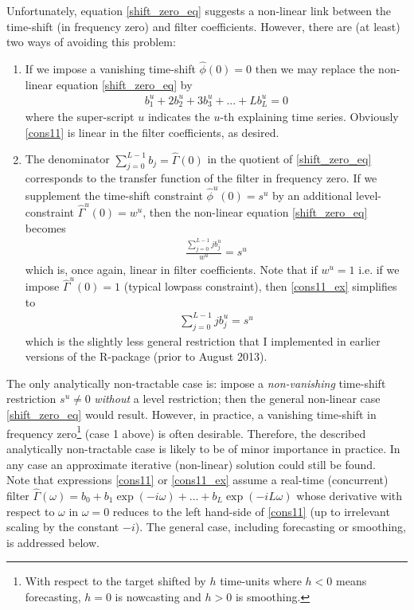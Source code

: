 \documentclass[11pt]{article}
\begin{document}
Unfortunately, equation \ref{shift_zero_eq} suggests a non-linear link between the time-shift (in frequency zero) and filter coefficients. However, there are (at least) two ways of avoiding this problem:
\begin{enumerate}
\item If we impose a vanishing time-shift $\hat{\phi}(0)=0$ then we may replace  the non-linear equation \ref{shift_zero_eq} by 
\begin{eqnarray}\label{cons11}
b_1^u+2b_2^u+3b_3^u+...+Lb_L^u=0
\end{eqnarray}
where the super-script $u$ indicates the $u$-th explaining time series. Obviously \ref{cons11} is linear in the filter coefficients, as desired.
\item The denominator $\sum_{j=0}^{L-1}b_j=\hat{\Gamma}(0)$ in the quotient of \ref{shift_zero_eq} corresponds to the transfer function of the filter in frequency zero. If we supplement the time-shift constraint $\hat{\phi}^u(0)=s^u$ by an additional level-constraint $\hat{\Gamma}^u(0)=w^u$, then the non-linear equation \ref{shift_zero_eq} becomes
\begin{eqnarray}\label{cons11_ex}
\frac{\sum_{j=0}^{L-1}jb_j^u}{w^u}=s^u
\end{eqnarray}
which is, once again, linear in filter coefficients. Note that if $w^u=1$ i.e. if we impose $\hat{\Gamma}^u(0)=1$ (typical lowpass constraint), then \ref{cons11_ex} simplifies to 
\begin{eqnarray*}
\sum_{j=0}^{L-1}jb_j^u=s^u
\end{eqnarray*}
which is the slightly less general restriction that I implemented in earlier versions of the R-package (prior to August 2013).
\end{enumerate}  
The only analytically non-tractable case is: impose a \emph{non-vanishing} time-shift restriction $s^u\not=0$ \emph{without} a level restriction; then the general non-linear case \ref{shift_zero_eq} would result. However, in practice, a vanishing time-shift in frequency zero\footnote{With respect to the target shifted by $h$ time-units where $h<0$ means 
forecasting, $h=0$ is nowcasting and $h>0$ is smoothing.} (case 1 above) is often desirable. Therefore, the described analytically non-tractable case is likely to be of minor importance in practice. In any case an approximate iterative (non-linear) solution could still be found.\\ 



Note that expressions \ref{cons11} or \ref{cons11_ex} assume a real-time (concurrent) filter $\hat{\Gamma}(\omega)=b_0+b_1\exp(-i\omega)+...+b_L\exp(-iL\omega)$ whose derivative with respect to $\omega$ in $\omega=0$ reduces to the left hand-side of \ref{cons11} (up to irrelevant scaling by the constant $-i$). The general case, including forecasting or smoothing, is addressed below.\\ 
\end{document}
